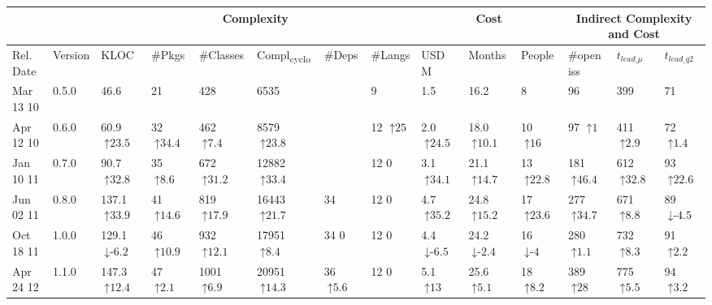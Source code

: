 \begin{tabular}{ll|llllll|lll|lll}
\toprule
\multicolumn{2}{c|}{} & \multicolumn{6}{c|}{Complexity} & \multicolumn{3}{c|}{Cost} & \multicolumn{3}{c}{Indirect Complexity and Cost}\\
\midrule
Rel. Date & Version & KLOC & \#Pkgs & \#Classes & Compl\textsubscript{cyclo} & \#Deps & \#Langs & USD M & Months & People & \#open iss & $t_{lead\_\mu}$ & $t_{lead\_q2}$ \\
\midrule
Mar 13 10 & 0.5.0 & 46.6    & 21    & 428    & 6535    &     & 9    & 1.5    & 16.2    & 8    & 96    & 399    & 71    \\
Apr 12 10 & 0.6.0 & 60.9 {\tiny $\uparrow\text{23.5}$} & 32 {\tiny $\uparrow\text{34.4}$} & 462 {\tiny $\uparrow\text{7.4}$} & 8579 {\tiny $\uparrow\text{23.8}$} &     & 12 {\tiny $\uparrow\text{25}$} & 2.0 {\tiny $\uparrow\text{24.5}$} & 18.0 {\tiny $\uparrow\text{10.1}$} & 10 {\tiny $\uparrow\text{16}$} & 97 {\tiny $\uparrow\text{1}$} & 411 {\tiny $\uparrow\text{2.9}$} & 72 {\tiny $\uparrow\text{1.4}$} \\
Jan 10 11 & 0.7.0 & 90.7 {\tiny $\uparrow\text{32.8}$} & 35 {\tiny $\uparrow\text{8.6}$} & 672 {\tiny $\uparrow\text{31.2}$} & 12882 {\tiny $\uparrow\text{33.4}$} &     & 12 {\tiny $\text{0}$} & 3.1 {\tiny $\uparrow\text{34.1}$} & 21.1 {\tiny $\uparrow\text{14.7}$} & 13 {\tiny $\uparrow\text{22.8}$} & 181 {\tiny $\uparrow\text{46.4}$} & 612 {\tiny $\uparrow\text{32.8}$} & 93 {\tiny $\uparrow\text{22.6}$} \\
Jun 02 11 & 0.8.0 & 137.1 {\tiny $\uparrow\text{33.9}$} & 41 {\tiny $\uparrow\text{14.6}$} & 819 {\tiny $\uparrow\text{17.9}$} & 16443 {\tiny $\uparrow\text{21.7}$} & 34    & 12 {\tiny $\text{0}$} & 4.7 {\tiny $\uparrow\text{35.2}$} & 24.8 {\tiny $\uparrow\text{15.2}$} & 17 {\tiny $\uparrow\text{23.6}$} & 277 {\tiny $\uparrow\text{34.7}$} & 671 {\tiny $\uparrow\text{8.8}$} & 89 {\tiny $\downarrow\text{-}\text{4.5}$} \\
Oct 18 11 & 1.0.0 & 129.1 {\tiny $\downarrow\text{-}\text{6.2}$} & 46 {\tiny $\uparrow\text{10.9}$} & 932 {\tiny $\uparrow\text{12.1}$} & 17951 {\tiny $\uparrow\text{8.4}$} & 34 {\tiny $\text{0}$} & 12 {\tiny $\text{0}$} & 4.4 {\tiny $\downarrow\text{-}\text{6.5}$} & 24.2 {\tiny $\downarrow\text{-}\text{2.4}$} & 16 {\tiny $\downarrow\text{-}\text{4}$} & 280 {\tiny $\uparrow\text{1.1}$} & 732 {\tiny $\uparrow\text{8.3}$} & 91 {\tiny $\uparrow\text{2.2}$} \\
Apr 24 12 & 1.1.0 & 147.3 {\tiny $\uparrow\text{12.4}$} & 47 {\tiny $\uparrow\text{2.1}$} & 1001 {\tiny $\uparrow\text{6.9}$} & 20951 {\tiny $\uparrow\text{14.3}$} & 36 {\tiny $\uparrow\text{5.6}$} & 12 {\tiny $\text{0}$} & 5.1 {\tiny $\uparrow\text{13}$} & 25.6 {\tiny $\uparrow\text{5.1}$} & 18 {\tiny $\uparrow\text{8.2}$} & 389 {\tiny $\uparrow\text{28}$} & 775 {\tiny $\uparrow\text{5.5}$} & 94 {\tiny $\uparrow\text{3.2}$} \\

\end{tabular}
